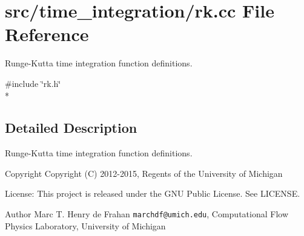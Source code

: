 \section{src/time\-\_\-integration/rk.cc File Reference}
\label{rk_8cc}


Runge-\/\-Kutta time integration function definitions.  


{\ttfamily \#include \char`\"{}rk.\-h\char`\"{}}\\*


\subsection{Detailed Description}
Runge-\/\-Kutta time integration function definitions. \begin{DoxyCopyright}{Copyright}
Copyright (C) 2012-\/2015, Regents of the University of Michigan 
\end{DoxyCopyright}
\begin{DoxyParagraph}{License\-:}
This project is released under the G\-N\-U Public License. See L\-I\-C\-E\-N\-S\-E. 
\end{DoxyParagraph}
\begin{DoxyAuthor}{Author}
Marc T. Henry de Frahan {\tt marchdf@umich.\-edu}, Computational Flow Physics Laboratory, University of Michigan 
\end{DoxyAuthor}
